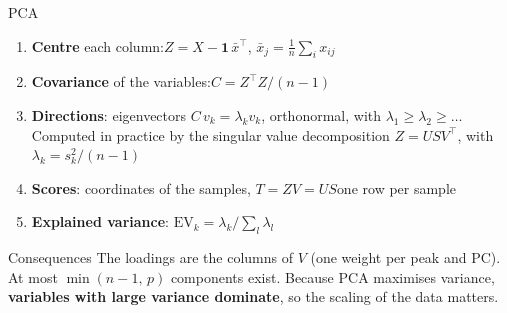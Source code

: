 \documentclass[aspectratio=169,10pt]{beamer}
\newcommand{\hl}[1]{{\color{warm}\bfseries #1}}
\begin{document}
\begin{frame}{PCA}
  \small
  \begin{enumerate}\setlength\itemsep{2.2mm}
    \item \hl{Centre} each column:\quad $Z = X - \mathbf 1\,\bar{x}^{\!\top}$, \quad $\bar{x}_j=\tfrac1n\sum_i x_{ij}$
    \item \hl{Covariance} of the variables:\quad $C = Z^{\top}Z/(n-1)$
    \item \hl{Directions}: eigenvectors $C\,v_k=\lambda_k v_k$, orthonormal, with $\lambda_1\ge\lambda_2\ge\dots$\\
          Computed in practice by the singular value decomposition $Z = U S V^{\top}$, with $\lambda_k = s_k^2/(n-1)$
    \item \hl{Scores}: coordinates of the samples, $T = Z V = U S$\hfill one row per sample
    \item \hl{Explained variance}: $\mathrm{EV}_k=\lambda_k\big/\sum_l\lambda_l$
  \end{enumerate}
  \vspace{2mm}
  \begin{block}{Consequences}
    The loadings are the columns of $V$ (one weight per peak and PC). At most $\min(n-1,\,p)$ components exist.
    Because PCA maximises variance, \hl{variables with large variance dominate}, so the scaling of the data matters.
  \end{block}
\end{frame}
\end{document}
